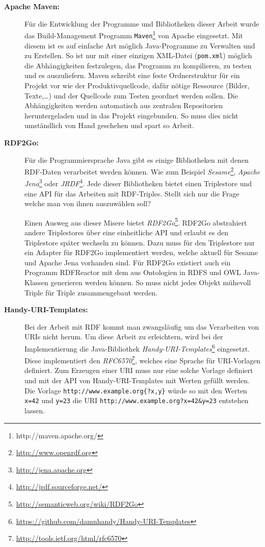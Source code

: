 \begin{description}
    \item[\textbf{Apache Maven:}] Für die Entwicklung der Programme und Bibliotheken dieser Arbeit wurde das Build-Management Programm \texttt{Maven}\footnote{http://maven.apache.org/} von Apache eingesetzt. Mit diesem ist es auf einfache Art möglich Java-Programme zu Verwalten und zu Erstellen. So ist nur mit einer einzigen XML-Datei (\texttt{pom.xml}) möglich die Abhängigkeiten festzulegen, das Programm zu kompilieren, zu testen und es auszuliefern. Maven schreibt eine feste Ordnerstruktur für ein Projekt vor wie der Produktivquellcode, dafür nötige Ressource (Bilder, Texte,\dots) und der Quellcode zum Testen geordnet werden sollen. Die Abhängigkeiten werden automatisch aus zentralen Repositorien heruntergeladen und in das Projekt eingebunden. So muss dies nicht umständlich von Hand geschehen und spart so Arbeit.

    \item[\textbf{RDF2Go:}] Für die Programmiersprache Java gibt es einige Bibliotheken mit denen RDF-Daten verarbeitet werden können. Wie zum Beispiel \emph{Sesame}\footnote{\url{http://www.openrdf.org}}, \emph{Apache Jena}\footnote{\url{http://jena.apache.org}} oder \emph{JRDF}\footnote{\url{http://jrdf.sourceforge.net/}}. Jede dieser Bibliotheken bietet einen Triplestore und eine API für das Arbeiten mit RDF-Triples. Stellt sich nur die Frage welche man von ihnen auszuwählen soll? 

    Einen Ausweg aus dieser Misere bietet \emph{RDF2Go}\footnote{\url{http://semanticweb.org/wiki/RDF2Go}}. RDF2Go abstrahiert andere Triplestores über eine einheitliche API und erlaubt es den Triplestore später wechseln zu können. Dazu muss für den Triplestore nur ein Adapter für RDF2Go implementiert werden, welche aktuell für Sesame und Apache Jena vorhanden sind. Für RDF2Go existiert auch ein Programm RDFReactor mit dem aus Ontologien in RDFS und OWL Java-Klassen generieren werden können. So muss nicht jedes Objekt mühevoll Triple für Triple zusammengebaut werden. 

    \item[\textbf{Handy-URI-Templates:}] Bei der Arbeit mit RDF kommt man zwangsläufig um das Verarbeiten von URIs nicht herum. Um diese Arbeit zu erleichtern, wird bei der Implementierung die Java-Bibliothek \emph{Handy-URI-Templates}\footnote{\url{https://github.com/damnhandy/Handy-URI-Templates}} eingesetzt. Diese implementiert den \emph{RFC6570}\footnote{\url{http://tools.ietf.org/html/rfc6570}}, welches eine Sprache für URI-Vorlagen definiert. Zum Erzeugen einer URI muss nur eine solche Vorlage definiert und mit der API von Handy-URI-Templates mit Werten gefüllt werden. Die Vorlage \texttt{http://www.example.org\{?x,y\}} würde so mit den Werten \texttt{x=42} und \texttt{y=23} die URI \texttt{http://www.example.org?x=42\&y=23} entstehen lassen.
\end{description}

